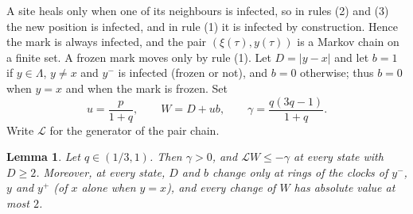 \documentclass[11pt]{amsart}
\newtheorem{lemma}[theorem]{Lemma}
\theoremstyle{definition}
\theoremstyle{remark}
\newcommand{\cL}{\mathcal{L}}
\begin{document}
A site heals only when one of its neighbours is infected, so in rules (2) and (3) the new position is infected, and in rule
(1) it is infected by construction. Hence the mark is always infected, and the pair $(\xi(\tau),y(\tau))$ is a Markov chain
on a finite set. A frozen mark moves only by rule (1). Let $D=|y-x|$ and let $b=1$ if $y\in\Lambda$, $y\ne x$ and $y^-$ is
infected (frozen or not), and $b=0$ otherwise; thus $b=0$ when $y=x$ and when the mark is frozen. Set
\begin{equation}\label{eq:consts}
u=\frac{p}{1+q},\qquad W=D+ub,\qquad \gamma=\frac{q(3q-1)}{1+q}.
\end{equation}
Write $\cL$ for the generator of the pair chain.

\begin{lemma}\label{lem:drift}
Let $q\in(1/3,1)$. Then $\gamma>0$, and $\cL W\le-\gamma$ at every state with $D\ge2$. Moreover, at every state, $D$ and
$b$ change only at rings of the clocks of $y^-$, $y$ and $y^+$ (of $x$ alone when $y=x$), and every change of $W$ has
absolute value at most $2$.
\end{lemma}
\end{document}
